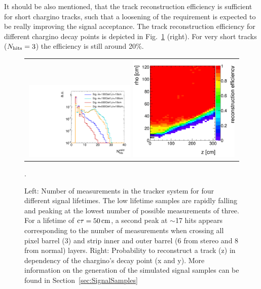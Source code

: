 It should be also mentioned, that the track reconstruction efficiency is sufficient for short chargino tracks, such that a loosening of the \nhits requirement is expected to be really improving the signal acceptance.
The track reconstruction efficiency for different chargino decay points is depicted in Fig.~\ref{fig:NHits_2Signal_noSelection_normalized} (right).
For very short tracks ($N_{\text{hits}}=3$) the efficiency is still around 20\%.\\
\begin{figure}[!t]
  \centering 
  \begin{tabular}{c}
  \includegraphics[width=0.49\textwidth]{figures/analysis/MotivationAndGeneralSearchStrategy/htrackNValid_log_chiTracksnoSelection.pdf}
  \includegraphics[width=0.49\textwidth]{figures/analysis/MotivationAndGeneralSearchStrategy/RecoEffTracksZoom.png}
  \end{tabular}
  \caption{Left: Number of measurements in the tracker system \nhits for four different signal lifetimes.
                 The low lifetime samples are rapidly falling and peaking at the lowest number of possible measurements of three. 
                 For a lifetime of $\text{c}\tau=50\,\text{cm}$, a second peak at $\sim$17 hits appears corresponding to the number of measurements when crossing all pixel barrel (3) and strip inner and outer barrel (6 from stereo and 8 from normal) layers.
           Right: Probability to reconstruct a track (z) in dependency of the chargino's decay point (x and y).
           More information on the generation of the simulated signal samples can be found in Section~\ref{sec:SignalSamples}}. 
  \label{fig:NHits_2Signal_noSelection_normalized}
\end{figure}



